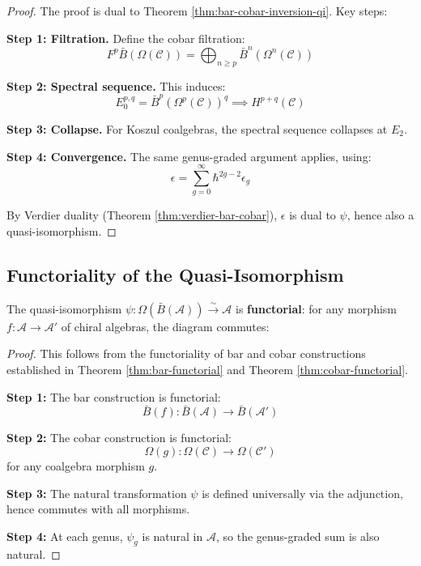 \begin{proof}
The proof is dual to Theorem \ref{thm:bar-cobar-inversion-qi}. Key steps:

\textbf{Step 1: Filtration.} Define the cobar filtration:
$$F^p\bar{B}(\Omega(\mathcal{C})) = \bigoplus_{n \geq p} \bar{B}^n(\Omega^n(\mathcal{C}))$$

\textbf{Step 2: Spectral sequence.} This induces:
$$E_0^{p,q} = \bar{B}^p(\Omega^p(\mathcal{C}))^q \implies H^{p+q}(\mathcal{C})$$

\textbf{Step 3: Collapse.} For Koszul coalgebras, the spectral sequence collapses 
at $E_2$.

\textbf{Step 4: Convergence.} The same genus-graded argument applies, using:
$$\epsilon = \sum_{g=0}^\infty \hbar^{2g-2} \epsilon_g$$

By Verdier duality (Theorem \ref{thm:verdier-bar-cobar}), $\epsilon$ is dual to $\psi$, 
hence also a quasi-isomorphism.
\end{proof}

\subsection{Functoriality of the Quasi-Isomorphism}

\begin{theorem}[Functoriality]\label{thm:bar-cobar-inversion-functorial}
The quasi-isomorphism $\psi: \Omega(\bar{B}(\mathcal{A})) \xrightarrow{\sim} \mathcal{A}$ 
is \textbf{functorial}: for any morphism $f: \mathcal{A} \to \mathcal{A}'$ of 
chiral algebras, the diagram commutes:

\begin{center}
\end{center}
\end{theorem}

\begin{proof}
This follows from the functoriality of bar and cobar constructions established 
in Theorem \ref{thm:bar-functorial} and Theorem \ref{thm:cobar-functorial}.

\textbf{Step 1:} The bar construction is functorial:
$$\bar{B}(f): \bar{B}(\mathcal{A}) \to \bar{B}(\mathcal{A}')$$

\textbf{Step 2:} The cobar construction is functorial:
$$\Omega(g): \Omega(\mathcal{C}) \to \Omega(\mathcal{C}')$$
for any coalgebra morphism $g$.

\textbf{Step 3:} The natural transformation $\psi$ is defined universally via the 
adjunction, hence commutes with all morphisms.

\textbf{Step 4:} At each genus, $\psi_g$ is natural in $\mathcal{A}$, so the 
genus-graded sum is also natural.
\end{proof}

